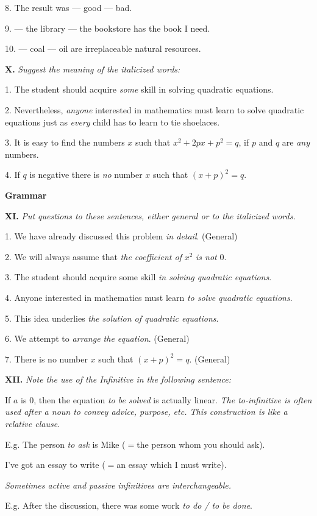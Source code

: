\documentclass[a4paper]{article}
\newcommand{\ESect}[1]{\medskip\par{\large \textbf{#1}}\par}
\newcommand{\ETask}[2]{\medskip\par\textbf{#1.} \textit{#2}\par}
\begin{document}
8. The result was --- good --- bad.

9. --- the library --- the bookstore has the book I need.

10. --- coal --- oil are irreplaceable natural resources.

\ETask{X}{Suggest the meaning of the italicized words:}
1. The student should acquire \textit{some} skill in solving quadratic equations.

2. Nevertheless, \textit{anyone} interested in mathematics must learn to solve quadratic equations just as \textit{every}
child has to learn to tie shoelaces.

3. It is easy to find the numbers $x$ such that $x^2+2px+p^2=q$, if $p$ and $q$ are \textit{any} numbers.

4. If $q$ is negative there is \textit{no} number $x$ such that $(x+p)^2=q$.

\ESect{Grammar}

\ETask{XI}{Put questions to these sentences, either general or to the italicized words.}

1. We have already discussed this problem \textit{in detail}. (General)

2. We will always assume that \textit{the coefficient of} $x^2$ \textit{is not} 0.

3. The student should acquire some skill \textit{in solving quadratic equations}.

4. Anyone interested in mathematics must learn \textit{to solve quadratic equations}.

5. This idea underlies \textit{the solution of quadratic equations}.

6. We attempt to \textit{arrange the equation}. (General)

7. There is no number $x$ such that $(x+p)^2=q$. (General)

\ETask{XII}{Note the use of the Infinitive in the following sentence:}
If $a$ is 0, then the equation \textit{to be solved} is actually linear.
\textit{The to-infinitive is often used after a noun to convey advice, purpose, etc. This construction is like a relative clause.}

E.g. The person \textit{to ask} is Mike ($=$the person whom you should ask).

I've got an essay to write ($=$an essay which I must write).

\textit{Sometimes active and passive infinitives are interchangeable.}

E.g. After the discussion, there was some work \textit{to do / to be done}.
\end{document}
